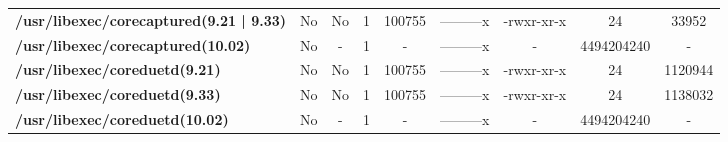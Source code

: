 \begin{center}
{\begin{tabular}{|>{\bfseries} l | C | C | C | C | C | C | C | C |}
					/usr/libexec/corecaptured(9.21 | 9.33) & No & No & \color{green}1 & \color{red}100755 & \color{green}---------x & \color{red}-rwxr-xr-x & \color{green}24 & \color{red}33952\\ 
					/usr/libexec/corecaptured(10.02) & No & - & 1 & - & ---------x & - & 4494204240 & -\\ 
					/usr/libexec/coreduetd(9.21) & No & No & \color{green}1 & \color{red}100755 & \color{green}---------x & \color{red}-rwxr-xr-x & \color{green}24 & \color{red}1120944\\ 
					/usr/libexec/coreduetd(9.33) & No & No & \color{green}1 & \color{red}100755 & \color{green}---------x & \color{red}-rwxr-xr-x & \color{green}24 & \color{red}1138032\\ 
					/usr/libexec/coreduetd(10.02) & No & - & 1 & - & ---------x & - & 4494204240 & -\\ 

			\end{tabular}
		}
	\end{center}



